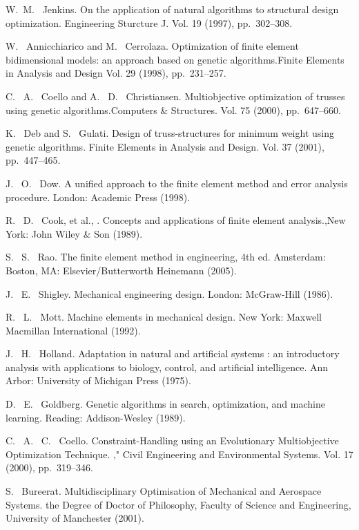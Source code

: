 
\begin{thebibliography}{10}
{\sc W.~M.~ Jenkins}. {On the application of natural algorithms to structural design optimization}. Engineering Sturcture J.  Vol. 19 (1997), pp.~302--308.

{\sc W. ~Annicchiarico and M. ~Cerrolaza}. {Optimization of finite element bidimensional models: an approach based on genetic algorithms}.Finite Elements in Analysis and Design  Vol. 29 (1998), pp.~231--257.

{\sc C. ~A. ~Coello and A. ~D. ~Christiansen}. {Multiobjective optimization of trusses using genetic algorithms}.Computers \& Structures. Vol. 75 (2000), pp.~647--660.

{\sc K. ~Deb and S. ~Gulati}. {Design of truss-structures for minimum weight using genetic algorithms}. Finite Elements in Analysis and Design. Vol. 37 (2001), pp.~447--465.

{\sc J. ~O. ~Dow}. {A unified approach to the finite element method and error analysis procedure}. London: Academic Press (1998).

{\sc R. ~D. ~Cook, et al., }. {Concepts and applications of finite element analysis}.,New York: John Wiley \& Son (1989).

{\sc S. ~S. ~Rao}. {The finite element method in engineering, 4th ed}. Amsterdam: Boston, MA: Elsevier/Butterworth Heinemann (2005).

{\sc J. ~E. ~Shigley}. {Mechanical engineering design.} London: McGraw-Hill (1986).

{\sc R. ~L. ~Mott}. {Machine elements in mechanical design}. New York: Maxwell Macmillan International (1992).

{\sc J. ~H. ~Holland}. {Adaptation in natural and artificial systems : an introductory analysis with applications to biology, control, and artificial intelligence}. Ann Arbor: University of Michigan Press (1975).

{\sc D. ~E. ~Goldberg}. {Genetic algorithms in search, optimization, and machine learning}. Reading: Addison-Wesley (1989).

{\sc C. ~A. ~C. ~Coello}. {Constraint-Handling using an Evolutionary Multiobjective Optimization Technique}. ," Civil Engineering and Environmental Systems. Vol. 17 (2000), pp.~319--346.

{\sc S. ~Bureerat}. {Multidisciplinary Optimisation of Mechanical and Aerospace Systems}. the Degree of Doctor of Philosophy, Faculty of Science and Engineering, University of Manchester (2001).
\end{thebibliography}
